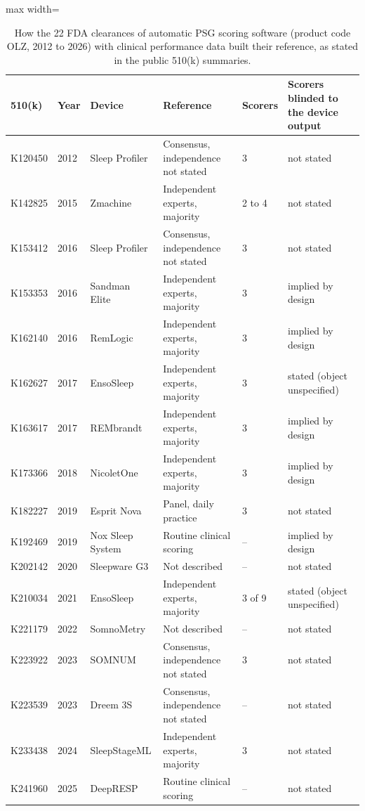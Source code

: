 \begin{table}[h!]
\centering
\footnotesize
\caption{How the 22 FDA clearances of automatic PSG scoring software (product code OLZ, 2012 to 2026) with clinical performance data built their reference, as stated in the public 510(k) summaries.}
\label{tab:s-fda}
\begin{adjustbox}{max width=\linewidth}
\begin{tabular}{lllllp{3.2cm}}
\toprule
510(k) & Year & Device & Reference & Scorers & Scorers blinded to the device output \\
\midrule
K120450 & 2012 & Sleep Profiler & Consensus, independence not stated & 3 & not stated \\
K142825 & 2015 & Zmachine & Independent experts, majority & 2 to 4 & not stated \\
K153412 & 2016 & Sleep Profiler & Consensus, independence not stated & 3 & not stated \\
K153353 & 2016 & Sandman Elite & Independent experts, majority & 3 & implied by design \\
K162140 & 2016 & RemLogic & Independent experts, majority & 3 & implied by design \\
K162627 & 2017 & EnsoSleep & Independent experts, majority & 3 & stated (object unspecified) \\
K163617 & 2017 & REMbrandt & Independent experts, majority & 3 & implied by design \\
K173366 & 2018 & NicoletOne & Independent experts, majority & 3 & implied by design \\
K182227 & 2019 & Esprit Nova & Panel, daily practice & 3 & not stated \\
K192469 & 2019 & Nox Sleep System & Routine clinical scoring & -- & implied by design \\
K202142 & 2020 & Sleepware G3 & Not described & -- & not stated \\
K210034 & 2021 & EnsoSleep & Independent experts, majority & 3 of 9 & stated (object unspecified) \\
K221179 & 2022 & SomnoMetry & Not described & -- & not stated \\
K223922 & 2023 & SOMNUM & Consensus, independence not stated & 3 & not stated \\
K223539 & 2023 & Dreem 3S & Consensus, independence not stated & -- & not stated \\
K233438 & 2024 & SleepStageML & Independent experts, majority & 3 & not stated \\
K241960 & 2025 & DeepRESP & Routine clinical scoring & -- & not stated \\

\end{tabular}
\end{adjustbox}
\end{table}
